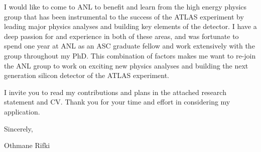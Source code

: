 \documentclass[a4paper]{article}
\begin{document}


I would like to come to ANL to benefit and learn from the high energy physics group that has been instrumental to the success of the ATLAS experiment by leading major physics analyses and building key elements of the detector. I have a deep passion for and experience in both of these areas, and was
fortunate to spend one year at ANL as an ASC graduate fellow and work extensively with the group throughout my PhD.
This combination of factors makes me want to re-join the ANL group to work on exciting new physics analyses and building the next
generation silicon detector of the ATLAS experiment.



I invite you to read my contributions and plans in the attached research statement and CV. Thank you for your time and effort in considering my application.

\vspace{0.25cm}

Sincerely,

\vspace{0.25cm}
Othmane Rifki
\end{document}
